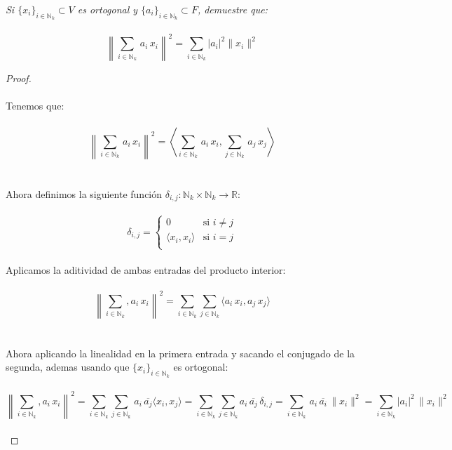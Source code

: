 \documentclass[11pt,letterpaper]{article}
\newcommand{\R}{\mathbb{R}}
\newcommand{\N}{\mathbb{N}}
\begin{document}
\begin{tcolorbox}[
	title = \textcolor{black}{\textcolor{white}{Problema 4}},]
\textit{Si $\{x_i\}_{i\in\N_k}\subset V$ es ortogonal y $\{a_i\}_{i\in \N_k}\subset F$, demuestre que:\,\\
\,\\
\begin{equation*}
	\left\|\sum_{i\in\N_k}\,a_i\,x_i\right\|^2=\sum_{i\in \N_k}|a_i|^2\|x_i\|^2
\end{equation*} 
}
\end{tcolorbox}
\begin{proof}\,\\
	\,\\
	Tenemos que:\,\\
	\,\\
	\begin{equation*}
		\left\|\sum_{i\in \N_k}\,a_i\,x_i \right\|^2=\left\langle \sum_{i\in \N_k}\,a_i\,x_i,\sum_{j\in \N_k}\,a_j\,x_j \right\rangle
	\end{equation*}\,\\
	\,\\
	Ahora definimos la siguiente funci\'on $\delta_{i,j}:\N_k\times \N_k\rightarrow \R$:\,\\
	\,\\
	\[
	\delta_{i,j} = 
	\begin{cases}
	0 & \text{si } i\neq j  \\
	\langle x_i,x_i \rangle& \text{si } i=j\\
	\end{cases}
	\]
	\,\\
	Aplicamos la aditividad de ambas entradas del producto interior:\,\\
	\,\\
	\begin{equation*}
		\left\|\sum_{i\in \N_k},a_i\,x_i \right\|^2=\sum_{i\in \N_k}\sum_{j\in \N_k}\langle a_i\,x_i,a_j\,x_j \rangle
	\end{equation*}\,\\
	\,\\
	Ahora aplicando la linealidad en la primera entrada y sacando el conjugado de la segunda, ademas usando que $\{x_i\}_{i\in \N_k}$ es ortogonal:\,\\
	\,\\
	\begin{equation*}
		\left\|\sum_{i\in \N_k},a_i\,x_i \right\|^2=\sum_{i\in\N_k}\sum_{j\in \N_k}\,a_i\,\overline{a_j}\langle x_i,x_j\rangle=\sum_{i\in \N_k}\sum_{j\in \N_k}a_i\,\overline{a_j}\,\delta_{i,j}=\sum_{i\in \N_k}\,a_i\,\overline{a_i}\,\|x_i\|^2=\sum_{i\in \N_k}|a_i|^2\,\|x_i\|^2
	\end{equation*}\,\\
\end{proof}\,\\
\end{document}
